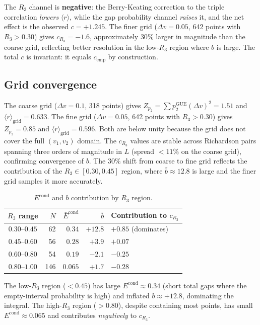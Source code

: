 \documentclass[11pt]{article}
\begin{document}
The $R_3$ channel is \textbf{negative}: the Berry-Keating correction to the
triple correlation \emph{lowers} $\langle r\rangle$, while the gap probability
channel \emph{raises} it, and the net effect is the observed $c = +1.245$.
The finer grid ($\Delta v = 0.05$, 642 points with $R_3 > 0.30$) gives
$c_{R_3} = -1.6$, approximately $30\%$ larger in magnitude than the coarse
grid, reflecting better resolution in the low-$R_3$ region where $b$ is large.
The total $c$ is invariant: it equals $c_{\mathrm{emp}}$ by construction.

\subsection{Grid convergence}

The coarse grid ($\Delta v = 0.1$, 318 points) gives
$Z_{p_2} = \sum p_2^{\mathrm{GUE}} (\Delta v)^2 = 1.51$
and $\langle r\rangle_{\mathrm{grid}} = 0.633$.
The fine grid ($\Delta v = 0.05$, 642 points with $R_3 > 0.30$) gives
$Z_{p_2} = 0.85$ and $\langle r\rangle_{\mathrm{grid}} = 0.596$.
Both are below unity because the grid does not cover the full
$(v_1, v_2)$ domain. The $c_{R_3}$ values are stable across
Richardson pairs spanning three orders of magnitude in $L$
(spread $< 11\%$ on the coarse grid), confirming convergence of $b$.
The $30\%$ shift from coarse to fine grid reflects the contribution
of the $R_3 \in [0.30, 0.45]$ region, where $\bar{b} \approx 12.8$
is large and the finer grid samples it more accurately.

\begin{table}[ht]
\centering
\caption{$E^{\mathrm{cond}}$ and $b$ contribution by $R_3$ region.}
\label{tab:regions}
\begin{tabular}{crrrl}
\toprule
$R_3$ range & $N$ & $\bar{E}^{\mathrm{cond}}$ & $\bar{b}$ & Contribution to $c_{R_3}$ \\
\midrule
$0.30$--$0.45$ & 62 & $0.34$ & $+12.8$ & $+0.85$ (dominates) \\
$0.45$--$0.60$ & 56 & $0.28$ & $+3.9$ & $+0.07$ \\
$0.60$--$0.80$ & 54 & $0.19$ & $-2.1$ & $-0.25$ \\
$0.80$--$1.00$ & 146 & $0.065$ & $+1.7$ & $-0.28$ \\
\bottomrule
\end{tabular}
\end{table}

The low-$R_3$ region ($< 0.45$) has large $E^{\mathrm{cond}} \approx 0.34$
(short total gaps where the empty-interval probability is high) and inflated
$b \approx +12.8$, dominating the integral. The high-$R_3$ region ($> 0.80$),
despite containing most points, has small $E^{\mathrm{cond}} \approx 0.065$
and contributes \emph{negatively} to $c_{R_3}$.
\end{document}
